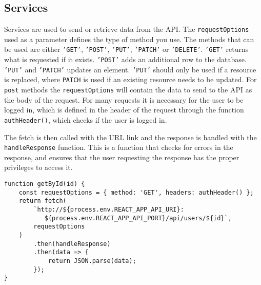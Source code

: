 \subsection{Services}
Services are used to send or retrieve data from the API. 
The \texttt{requestOptions} used as a parameter defines the type of method you use.
The methods that can be used are either \texttt{'GET'}, \texttt{'POST'}, \texttt{'PUT'}, \texttt{'PATCH'} or \texttt{'DELETE'}.
\texttt{'GET'} returns what is requested if it exists.
\texttt{'POST'} adds an additional row to the database.
\texttt{'PUT'} and \texttt{'PATCH'} updates an element. 
\texttt{'PUT'} should only be used if a resource is replaced, where \texttt{PATCH} is used if an existing resource needs to be updated.
For \texttt{post} methods the \texttt{requestOptions} will contain the data to send to the API as the body of the request.
For many requests it is necessary for the user to be logged in, which is defined in the header of the request through the function \texttt{authHeader()}, which checks if the user is logged in.

The fetch is then called with the URL link and the response is handled with the \texttt{handleResponse} function. 
This is a function that checks for errors in the response, and ensures that the user requesting the response has the proper privileges to access it.

\begin{lstlisting}[caption={Function to get a user by ID.}, captionpos=b, label={material-ui}]
function getById(id) {
	const requestOptions = { method: 'GET', headers: authHeader() };
	return fetch(
        `http://${process.env.REACT_APP_API_URI}:
           ${process.env.REACT_APP_API_PORT}/api/users/${id}`,
		requestOptions
	)
		.then(handleResponse)
		.then(data => {
			return JSON.parse(data);
		});
}
\end{lstlisting}



